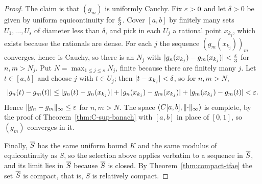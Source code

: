 \begin{proof}
The claim is that $(g_m)$ is uniformly Cauchy. Fix $\varepsilon > 0$ and let
$\delta > 0$ be given by uniform equicontinuity for $\frac{\varepsilon}{3}$. Cover
$[a,b]$ by finitely many sets $U_1, \dots, U_s$ of diameter less than
$\delta$, and pick in each $U_j$ a rational point $x_{k_j}$, which exists
because the rationals are dense. For each $j$ the sequence
$(g_m(x_{k_j}))_m$ converges, hence is Cauchy, so there is an $N_j$ with
$\lvert g_n(x_{k_j}) - g_m(x_{k_j})\rvert < \frac{\varepsilon}{3}$ for $n, m > N_j$. Put
$N = \max_{1 \le j \le s} N_j$, finite because there are finitely many $j$.
Let $t \in [a,b]$ and choose $j$ with $t \in U_j$; then
$\lvert t - x_{k_j}\rvert < \delta$, so for $n, m > N$,
\[
  \lvert g_n(t) - g_m(t)\rvert
  \le \lvert g_n(t) - g_n(x_{k_j})\rvert
    + \lvert g_n(x_{k_j}) - g_m(x_{k_j})\rvert
    + \lvert g_m(x_{k_j}) - g_m(t)\rvert
  < \varepsilon .
\]
Hence $\lVert g_n - g_m\rVert_\infty \le \varepsilon$ for $n,m > N$. The space
$(C[a,b], \lVert\cdot\rVert_\infty)$ is complete, by the proof of
Theorem~\ref{thm:C-sup-banach} with $[a,b]$ in place of $[0,1]$, so $(g_m)$
converges in it.

Finally, $\overline{S}$ has the same uniform bound $K$ and the same modulus of
equicontinuity as $S$, so the selection above applies verbatim to a sequence
in $\overline{S}$, and its limit lies in $\overline{S}$ because $\overline{S}$ is closed. By
Theorem~\ref{thm:compact-tfae} the set $\overline{S}$ is compact, that is, $S$ is
relatively compact.
\end{proof}
